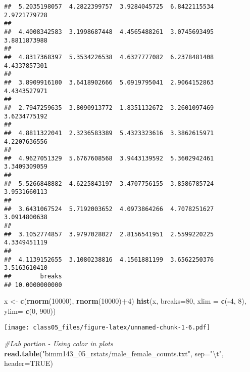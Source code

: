 \documentclass[]{article}
\newenvironment{Shaded}{\begin{snugshade}}{\end{snugshade}}
\newcommand{\KeywordTok}[1]{\textcolor[rgb]{0.13,0.29,0.53}{\textbf{#1}}}
\newcommand{\DataTypeTok}[1]{\textcolor[rgb]{0.13,0.29,0.53}{#1}}
\newcommand{\DecValTok}[1]{\textcolor[rgb]{0.00,0.00,0.81}{#1}}
\newcommand{\CharTok}[1]{\textcolor[rgb]{0.31,0.60,0.02}{#1}}
\newcommand{\StringTok}[1]{\textcolor[rgb]{0.31,0.60,0.02}{#1}}
\newcommand{\CommentTok}[1]{\textcolor[rgb]{0.56,0.35,0.01}{\textit{#1}}}
\newcommand{\OtherTok}[1]{\textcolor[rgb]{0.56,0.35,0.01}{#1}}
\newcommand{\OperatorTok}[1]{\textcolor[rgb]{0.81,0.36,0.00}{\textbf{#1}}}
\newcommand{\NormalTok}[1]{#1}
\begin{document}
\begin{verbatim}
##  5.2035198057  4.2822399757  3.9284045725  6.8422115534  2.9721779728 
##                                                                       
##  4.4008342583  3.1998687448  4.4565488261  3.0745693495  3.8811873988 
##                                                                       
##  4.8317368397  5.3534226538  4.6327777082  6.2378481408  4.4337857301 
##                                                                       
##  3.8909916100  3.6418902666  5.0919795041  2.9064152863  4.4343527971 
##                                                                       
##  2.7947259635  3.8090913772  1.8351132672  3.2601097469  3.6234775192 
##                                                                       
##  4.8811322041  2.3236583389  5.4323323616  3.3862615971  4.2207636556 
##                                                                       
##  4.9627051329  5.6767608568  3.9443139592  5.3602942461  3.3409309059 
##                                                                       
##  5.5266848882  4.6225843197  3.4707756155  3.8586785724  3.9531660113 
##                                                                       
##  3.6431067524  5.7192003652  4.0973864266  4.7078251627  3.0914800638 
##                                                                       
##  3.1052774857  3.9797028027  2.8156541951  2.5599220225  4.3349451119 
##                                                                       
##  4.1139152655  3.1080238816  4.1561881199  3.6562250376  3.5163610410 
##        breaks 
## 10.0000000000
\end{verbatim}

\begin{Shaded}
\begin{Highlighting}[]
\NormalTok{x <-}\StringTok{ }\KeywordTok{c}\NormalTok{(}\KeywordTok{rnorm}\NormalTok{(}\DecValTok{10000}\NormalTok{), }\KeywordTok{rnorm}\NormalTok{(}\DecValTok{10000}\NormalTok{)}\OperatorTok{+}\DecValTok{4}\NormalTok{)}
\KeywordTok{hist}\NormalTok{(x, }\DataTypeTok{breaks=}\DecValTok{80}\NormalTok{, }\DataTypeTok{xlim =} \KeywordTok{c}\NormalTok{(}\OperatorTok{-}\DecValTok{4}\NormalTok{, }\DecValTok{8}\NormalTok{), }\DataTypeTok{ylim=} \KeywordTok{c}\NormalTok{(}\DecValTok{0}\NormalTok{, }\DecValTok{900}\NormalTok{))}
\end{Highlighting}
\end{Shaded}

\texttt{[image: class05\_files/figure-latex/unnamed-chunk-1-6.pdf]}

\begin{Shaded}
\begin{Highlighting}[]
\CommentTok{#Lab portion - Using color in plots}
\KeywordTok{read.table}\NormalTok{(}\StringTok{"bimm143_05_rstats/male_female_counts.txt"}\NormalTok{, }\DataTypeTok{sep=}\StringTok{"}\CharTok{\textbackslash{}t}\StringTok{"}\NormalTok{, }\DataTypeTok{header=}\OtherTok{TRUE}\NormalTok{)}
\end{Highlighting}
\end{Shaded}
\end{document}
